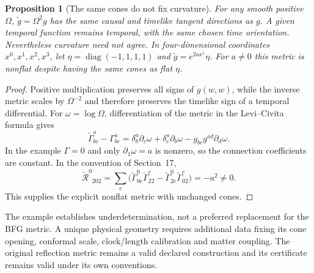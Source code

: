 \documentclass[11pt,letterpaper]{article}
\newcommand{\diag}{\operatorname{diag}}
\newtheorem{proposition}[theorem]{Proposition}
\theoremstyle{definition}
\numberwithin{equation}{section}
\begin{document}
\begin{proposition}[The same cones do not fix curvature]\label{conformalnonunique}
For any smooth positive $\Omega$, $\widetilde g=\Omega^2g$ has the same causal and timelike tangent directions as $g$. A given temporal function remains temporal, with the same chosen time orientation. Nevertheless curvature need not agree. In four-dimensional coordinates $x^0,x^1,x^2,x^3$, let $\eta=\diag(-1,1,1,1)$ and $\widetilde g=e^{2ax^1}\eta$. For $a\ne0$ this metric is nonflat despite having the same cones as flat $\eta$.
\end{proposition}
\begin{proof}
Positive multiplication preserves all signs of $g(w,w)$, while the inverse metric scales by $\Omega^{-2}$ and therefore preserves the timelike sign of a temporal differential. For $\omega=\log\Omega$, differentiation of the metric in the Levi--Civita formula gives
\begin{equation}
\widetilde\Gamma^a_{bc}-\Gamma^a_{bc}
=\delta^a_b\partial_c\omega+\delta^a_c\partial_b\omega-g_{bc}g^{ad}\partial_d\omega.
\end{equation}
In the example $\Gamma=0$ and only $\partial_1\omega=a$ is nonzero, so the connection coefficients are constant. In the convention of Section~17,
\begin{equation}
\widetilde{\mathcal R}^{0}{}_{202}
=\sum_e\bigl(\widetilde\Gamma^0_{0e}\widetilde\Gamma^e_{22}
-\widetilde\Gamma^0_{2e}\widetilde\Gamma^e_{02}\bigr)=-a^2\ne0.
\end{equation}
This supplies the explicit nonflat metric with unchanged cones.
\end{proof}
The example establishes underdetermination, not a preferred replacement for the BFG metric. A unique physical geometry requires additional data fixing its cone opening, conformal scale, clock/length calibration and matter coupling. The original reflection metric remains a valid declared construction and its certificate remains valid under its own conventions.
\end{document}
